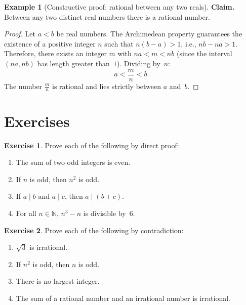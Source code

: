\documentclass[12pt,a4paper,openany]{book}
\theoremstyle{definition}
\newtheorem{example}[definition]{Example}
\newtheorem{exercise}{Exercise}[chapter]
\theoremstyle{plain}
\theoremstyle{remark}
\newcommand{\N}{\mathbb{N}}
\begin{document}
\begin{example}[Constructive proof: rational between any two reals]
\label{ex:density-rationals}
\textbf{Claim.} Between any two distinct real numbers there is a rational number.

\begin{proof}
Let $a < b$ be real numbers. The Archimedean property
guarantees the existence of a positive integer $n$ such that $n(b - a) > 1$, i.e.,
$nb - na > 1$. Therefore, there exists an integer $m$ with $na < m < nb$
(since the interval $(na, nb)$ has length greater than~$1$). Dividing by~$n$:
\[
  a < \frac{m}{n} < b.
\]
The number $\frac{m}{n}$ is rational and lies strictly between $a$ and~$b$.
\end{proof}
\end{example}

\section{Exercises}
\label{sec:exercises-ch2}

\begin{exercise}
\label{exer:direct-proof-exercises}
Prove each of the following by direct proof:
\begin{enumerate}[label=(\alph*),nosep]
  \item The sum of two odd integers is even.
  \item If $n$ is odd, then $n^2$ is odd.
  \item If $a \mid b$ and $a \mid c$, then $a \mid (b + c)$.
  \item For all $n \in \N$, $n^3 - n$ is divisible by~$6$.
\end{enumerate}
\end{exercise}

\begin{exercise}
\label{exer:contradiction-exercises}
Prove each of the following by contradiction:
\begin{enumerate}[label=(\alph*),nosep]
  \item $\sqrt{3}$ is irrational.
  \item If $n^2$ is odd, then $n$ is odd.
  \item There is no largest integer.
  \item The sum of a rational number and an irrational number is irrational.
\end{enumerate}
\end{exercise}
\end{document}
